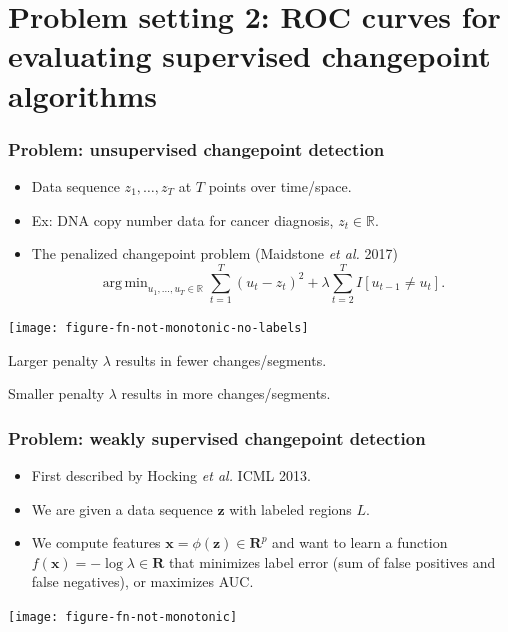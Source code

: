 \documentclass[t]{beamer}
\DeclareMathOperator*{\argmin}{arg\,min}
\begin{document}
\section{Problem setting 2: ROC curves for evaluating supervised changepoint algorithms}

\begin{frame}
  \frametitle{Problem: unsupervised changepoint detection}
  \begin{itemize}
  \item Data sequence $z_1,\dots,z_T$ at $T$ points over time/space.
  \item Ex: DNA copy number data for cancer diagnosis, $z_t\in\mathbb R$.
  \item The penalized changepoint problem (Maidstone \emph{et al.} 2017)
$$\argmin_{u_1,\dots,u_T\in\mathbb R} \sum_{t=1}^T (u_t - z_t)^2 + \lambda\sum_{t=2}^T I[u_{t-1} \neq u_t].$$
  \end{itemize}

  \parbox{0.6\textwidth}{
\texttt{[image: figure-fn-not-monotonic-no-labels]}
}
\parbox{0.3\textwidth}{
  Larger penalty $\lambda$ results in fewer changes/segments.

  \vskip 0.5in

  Smaller penalty $\lambda$ results in more changes/segments.
}

\end{frame}


\begin{frame}
  \frametitle{Problem: weakly supervised changepoint detection}
  \begin{itemize}
  \item First described by Hocking \emph{et al.} ICML 2013.
  \item We are given a data sequence $\mathbf z$ with labeled regions
    $L$.
  \item We compute features $\mathbf x=\phi(\mathbf z)\in\mathbf R^p$
    and want to learn a function $f(\mathbf x)=-\log\lambda\in\mathbf R$ that minimizes label error (sum of false positives and false negatives), or maximizes AUC.
  \end{itemize}

  \texttt{[image: figure-fn-not-monotonic]}

\end{frame}
\end{document}

